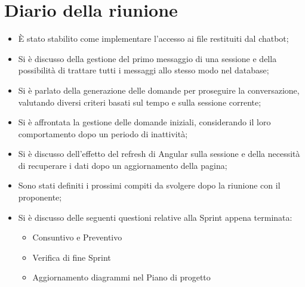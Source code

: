 
\section{Diario della riunione}

\begin{itemize}
    \item È stato stabilito come implementare l'accesso ai file restituiti dal chatbot;
    \item Si è discusso della gestione del primo messaggio di una sessione e della possibilità di trattare tutti i messaggi allo stesso modo nel database;
    \item Si è parlato della generazione delle domande per proseguire la conversazione, valutando diversi criteri basati sul tempo e sulla sessione corrente;
    \item Si è affrontata la gestione delle domande iniziali, considerando il loro comportamento dopo un periodo di inattività;
    \item Si è discusso dell’effetto del refresh di Angular sulla sessione e della necessità di recuperare i dati dopo un aggiornamento della pagina;
    \item Sono stati definiti i prossimi compiti da svolgere dopo la riunione con il proponente;
    \item Si è discusso delle seguenti questioni relative alla Sprint appena terminata:
        \begin{itemize}
            \item Consuntivo e Preventivo
            \item Verifica di fine Sprint
            \item Aggiornamento diagrammi nel Piano di progetto
        \end{itemize}
\end{itemize}
